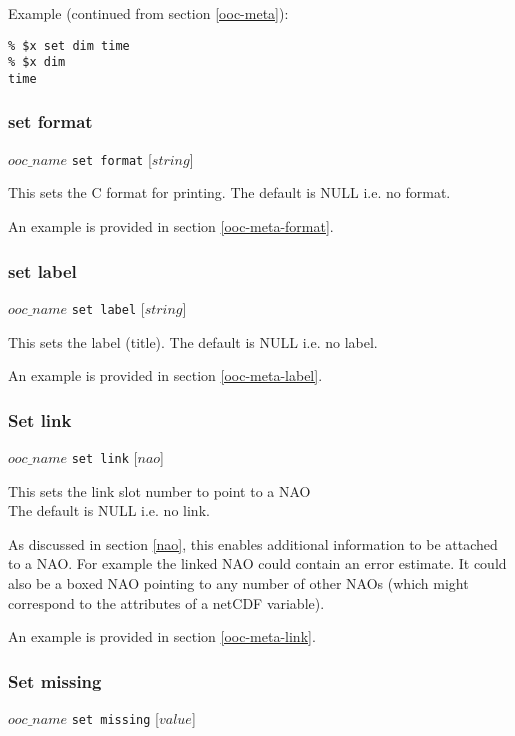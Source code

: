 Example (continued from section \ref{ooc-meta}):
  \begin{verbatim}
% $x set dim time
% $x dim
time
\end{verbatim}

\subsubsection{set format}
    \label{ooc-modify-set-format}

$ooc\_name$ \texttt{set format} [$string$]

This sets the C format for printing. The default is NULL i.e. no
  format.
  

An example is provided in section \ref{ooc-meta-format}.

\subsubsection{set label}
    \label{ooc-modify-set-label}

$ooc\_name$ \texttt{set label} [$string$]

This sets the label (title). The default is NULL i.e. no
  label.
  

An example is provided in section \ref{ooc-meta-label}.

\subsubsection{Set link}
    \label{ooc-modify-set-link}

$ooc\_name$ \texttt{set link} [$nao$]

This sets the link slot number to point to a NAO
  \\The default is NULL i.e. no link.
  
As discussed in section \ref{nao}, this enables additional information to be attached to a NAO.
For example the linked NAO could contain an error estimate.
It could also be a boxed NAO pointing to any number of other NAOs (which might correspond
to the attributes of a netCDF variable).

An example is provided in section \ref{ooc-meta-link}.

\subsubsection{Set missing}
    \label{ooc-modify-set-missing}

$ooc\_name$ \texttt{set missing} [$value$]

